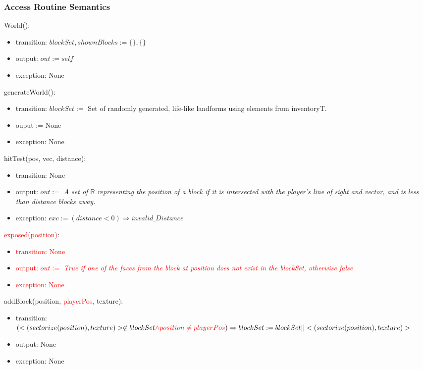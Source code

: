 \documentclass[12pt]{article}
\begin{document}
\subsubsection* {Access Routine Semantics}

World():
\begin{itemize}
\item transition: $blockSet, shownBlocks := \{\}, \{\} $
\item output: $\mathit{out} := \mathit{self}$
\item exception: None\\
\end{itemize}

\noindent generateWorld():
\begin{itemize}
\item transition: $blockSet := $ Set of randomly generated, life-like landforms using elements from inventoryT.
\item ouput := None
\item exception: None\\
\end{itemize}

\noindent hitTest(pos, vec, distance):
\begin{itemize}
\item transition: None
\item output: $out := $ \textit{A set of $\mathbb{R}$ representing the position of a block if it is intersected with the player's line of sight and vector, and is less than distance blocks away.}
\item exception: $exc := (distance < 0) \Rightarrow invalid\_Distance$\\
\end{itemize}

\noindent \textcolor{red}{exposed(position)}:
\begin{itemize}
\item \textcolor{red}{transition: None}
\item \textcolor{red}{output: $out := $ \textit{True if one of the faces from the block at position does not exist in the blockSet, otherwise false}} 
\item \textcolor{red}{exception: None}\\
\end{itemize}

\noindent addBlock(position, \textcolor{red}{playerPos, } texture):
\begin{itemize}
\item transition: $(< (sectorize(position), texture) > \not\in blockSet \textcolor{red}{\land position \neq playerPos}) \Rightarrow
blockSet := blockSet || < (sectorize(position), texture) >$
\item output: None
\item exception: None\\
\end{itemize}
\end{document}
